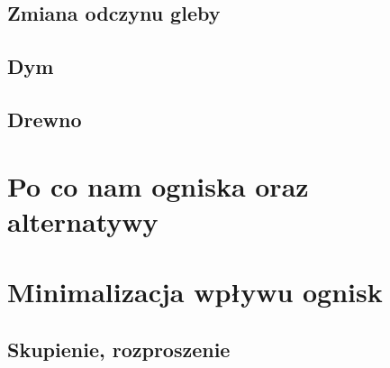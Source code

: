 \subsection{Zmiana odczynu gleby}



\subsection{Dym}

\subsection{Drewno}

\section{Po co nam ogniska oraz alternatywy}

\section{Minimalizacja wpływu ognisk}

\subsection{Skupienie, rozproszenie}